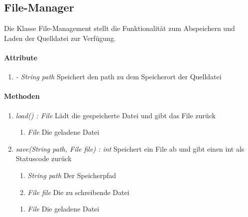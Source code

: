 \subsection{File-Manager}
Die Klasse File-Management stellt die Funktionalität zum Abspeichern und Laden der Quelldatei zur Verfügung.

\paragraph{Attribute}

\begin{enumerate}[$\bullet$]
	\item \textit{- String path} Speichert den path zu dem Speicherort der Quelldatei
\end{enumerate}

\paragraph{Methoden}

\begin{enumerate}[+]
	\item \textit{load() : File} Lädt die gespeicherte Datei und gibt das File zurück
	\begin{enumerate}[$\circ$]
		\item \textit{File} Die geladene Datei
	\end{enumerate}
	\item \textit{save(String path, File file) : int} Speichert ein File ab und gibt einen int als Statuscode zurück
	\begin{enumerate}[$\bullet$]
		\item \textit{String path} Der Speicherpfad
		\item \textit{File file} Die zu schreibende Datei
	\end{enumerate}
	\begin{enumerate}[$\circ$]
	\item \textit{File} Die geladene Datei
	\end{enumerate}
\end{enumerate}